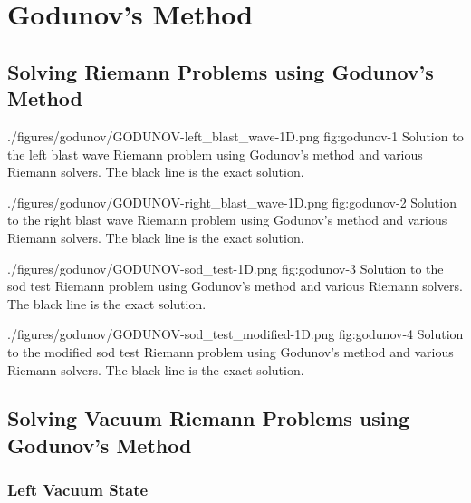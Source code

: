 \section{Godunov's Method}




\subsection{Solving Riemann Problems using Godunov's Method}


\quickfigcap
	{./figures/godunov/GODUNOV-left_blast_wave-1D.png}
	{fig:godunov-1}
	{
		Solution to the left blast wave 
		Riemann problem using Godunov's method and various Riemann solvers.
		The black line is the exact solution.
	}

\quickfigcap
	{./figures/godunov/GODUNOV-right_blast_wave-1D.png}
	{fig:godunov-2}
	{
		Solution to the right blast wave 
		Riemann problem using Godunov's method and various Riemann solvers.
		The black line is the exact solution.
	}

\quickfigcap
	{./figures/godunov/GODUNOV-sod_test-1D.png}
	{fig:godunov-3}
	{
		Solution to the sod test
		Riemann problem using Godunov's method and various Riemann solvers.
		The black line is the exact solution.
	}

\quickfigcap
	{./figures/godunov/GODUNOV-sod_test_modified-1D.png}
	{fig:godunov-4}
	{
		Solution to the modified sod test
		Riemann problem using Godunov's method and various Riemann solvers.
		The black line is the exact solution.
	}

	




\subsection{Solving Vacuum Riemann Problems using Godunov's Method}


\subsubsection{Left Vacuum State}



